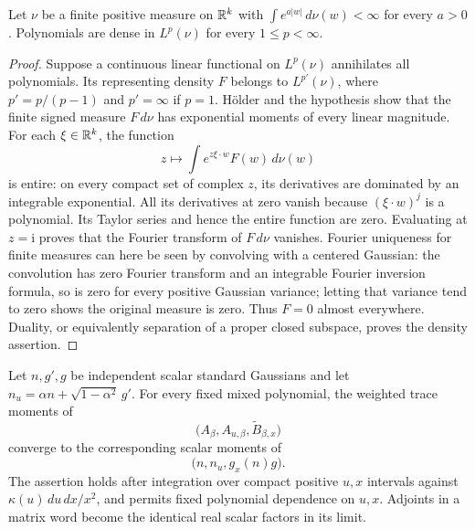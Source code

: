 \begin{lemma}
\label{lem:obs-polynomial-density}
Let $\nu$ be a finite positive measure on $\mathbb R^k$ with
$\int e^{a|w|}\,d\nu(w)<\infty$ for every $a>0$.  Polynomials
are dense in $L^p(\nu)$ for every $1\le p<\infty$.
\end{lemma}

\begin{proof}
Suppose a continuous linear functional on $L^p(\nu)$ annihilates
all polynomials.  Its representing density $F$ belongs to
$L^{p'}(\nu)$, where $p'=p/(p-1)$ and $p'=\infty$ if $p=1$.
H\"older and the hypothesis show that the finite signed measure
$F\,d\nu$ has exponential moments of every linear magnitude.
For each $\xi\in\mathbb R^k$, the function
\[
 z\longmapsto\int e^{z\xi\cdot w}F(w)\,d\nu(w)
\]
is entire: on every compact set of complex $z$, its derivatives
are dominated by an integrable exponential.  All its derivatives
at zero vanish because $(\xi\cdot w)^j$ is a polynomial.
Its Taylor series and hence the entire function are zero.
Evaluating at $z=\mathrm i$ proves that the Fourier transform of
$F\,d\nu$ vanishes.  Fourier uniqueness for finite measures can
here be seen by convolving with a centered Gaussian: the convolution
has zero Fourier transform and an integrable Fourier inversion
formula, so is zero for every positive Gaussian variance; letting
that variance tend to zero shows the original measure is zero.
Thus $F=0$ almost everywhere.  Duality, or equivalently separation
of a proper closed subspace, proves the density assertion.
\end{proof}

\begin{lemma}
\label{lem:obs-nonlinear-trace-law}
Let $n,g',g$ be independent scalar standard Gaussians and let
$n_u=\alpha n+\sqrt{1-\alpha^2}\,g'$.  For every fixed mixed
polynomial, the weighted trace moments of
\[
 \big(A_\beta,A_{u,\beta},\widetilde B_{\beta,x}\big)
\]
converge to the corresponding scalar moments of
\[
 \big(n,n_u,g_x(n)g\big).
\]
The assertion holds after integration over compact positive $u,x$
intervals against $\kappa(u)\,du\,dx/x^2$, and permits fixed
polynomial dependence on $u,x$.  Adjoints in a matrix word become
the identical real scalar factors in its limit.
\end{lemma}


